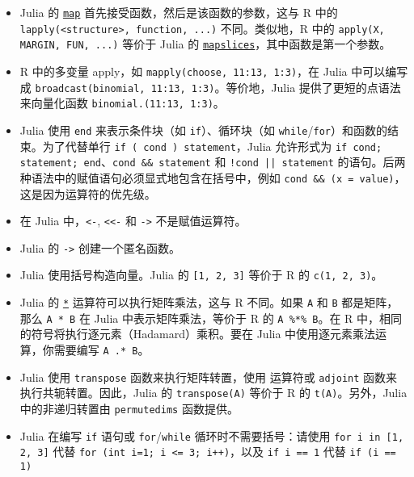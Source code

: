 \begin{itemize}
\item Julia 的 \hyperlink{11483231213869150535}{\texttt{map}} 首先接受函数，然后是该函数的参数，这与 R 中的 \texttt{lapply(<structure>, function, ...)} 不同。类似地，R 中的 \texttt{apply(X, MARGIN, FUN, ...)} 等价于 Julia 的 \hyperlink{8678396932318499078}{\texttt{mapslices}}，其中函数是第一个参数。


\item R 中的多变量 apply，如 \texttt{mapply(choose, 11:13, 1:3)}，在 Julia 中可以编写成 \texttt{broadcast(binomial, 11:13, 1:3)}。等价地，Julia 提供了更短的点语法来向量化函数 \texttt{binomial.(11:13, 1:3)}。


\item Julia 使用 \texttt{end} 来表示条件块（如 \texttt{if}）、循环块（如 \texttt{while}/\texttt{for}）和函数的结束。为了代替单行 \texttt{if ( cond ) statement}，Julia 允许形式为 \texttt{if cond; statement; end}、\texttt{cond \&\& statement} 和 \texttt{!cond || statement} 的语句。后两种语法中的赋值语句必须显式地包含在括号中，例如 \texttt{cond \&\& (x = value)}，这是因为运算符的优先级。


\item 在 Julia 中，\texttt{<-}, \texttt{<<-} 和 \texttt{->} 不是赋值运算符。


\item Julia 的 \texttt{->} 创建一个匿名函数。


\item Julia 使用括号构造向量。Julia 的 \texttt{[1, 2, 3]} 等价于 R 的 \texttt{c(1, 2, 3)}。


\item Julia 的 \hyperlink{7592762607639177347}{\texttt{*}} 运算符可以执行矩阵乘法，这与 R 不同。如果 \texttt{A} 和 \texttt{B} 都是矩阵，那么 \texttt{A * B} 在 Julia 中表示矩阵乘法，等价于 R 的 \texttt{A \%*\% B}。在 R 中，相同的符号将执行逐元素（Hadamard）乘积。要在 Julia 中使用逐元素乘法运算，你需要编写 \texttt{A .* B}。


\item Julia 使用 \texttt{transpose} 函数来执行矩阵转置，使用 \texttt{{\textquotesingle}} 运算符或 \texttt{adjoint} 函数来执行共轭转置。因此，Julia 的 \texttt{transpose(A)} 等价于 R 的 \texttt{t(A)}。另外，Julia 中的非递归转置由 \texttt{permutedims} 函数提供。


\item Julia 在编写 \texttt{if} 语句或 \texttt{for}/\texttt{while} 循环时不需要括号：请使用 \texttt{for i in [1, 2, 3]} 代替 \texttt{for (int i=1; i <= 3; i++)}，以及 \texttt{if i == 1} 代替 \texttt{if (i == 1)}



\end{itemize}
